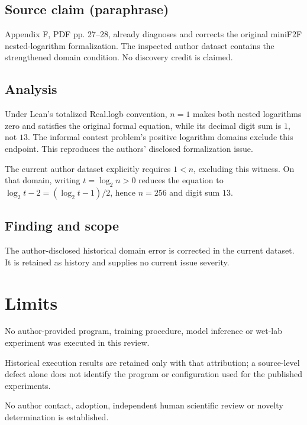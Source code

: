 \documentclass[11pt]{article}
\begin{document}
\subsection*{Source claim (paraphrase)}

Appendix F, PDF pp. 27–28, already diagnoses and corrects the original miniF2F nested-logarithm formalization. The inspected author dataset contains the strengthened domain condition. No discovery credit is claimed.

\subsection*{Analysis}

Under Lean's totalized Real.logb convention, \(n=1\) makes both nested logarithms zero and satisfies the original formal equation, while its decimal digit sum is \(1\), not \(13\). The informal contest problem's positive logarithm domains exclude this endpoint. This reproduces the authors' disclosed formalization issue.

The current author dataset explicitly requires \(1<n\), excluding this witness. On that domain, writing \(t=\log_2 n>0\) reduces the equation to \(\log_2t-2=(\log_2t-1)/2\), hence \(n=256\) and digit sum \(13\).

\subsection*{Finding and scope}

The author-disclosed historical domain error is corrected in the current dataset. It is retained as history and supplies no current issue severity.

\section*{Limits}

No author-provided program, training procedure, model inference or wet-lab experiment was executed in this review.\par

Historical execution results are retained only with that attribution; a source-level defect alone does not identify the program or configuration used for the published experiments.\par

No author contact, adoption, independent human scientific review or novelty determination is established.\par
\end{document}
